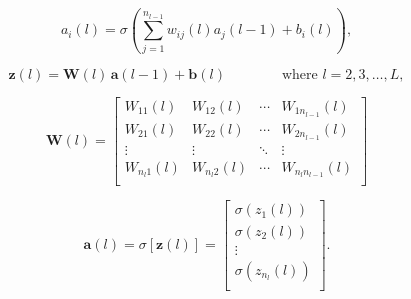 \documentclass[border=10pt,varwidth]{standalone}
\begin{document}
\begin{equation}
    a_i(l) = \sigma\left( \sum_{j=1}^{n_{l-1}} w_{ij}(l)a_j(l-1) +b_i(l) \right),
  \end{equation}

\begin{equation}
    \mathbf{z}(l) = \mathbf{W}(l) \, \mathbf{a}(l-1) + \mathbf{b}(l) \quad\quad\quad\quad \text{where } l= 2,3,\ldots,L,
\end{equation}

\begin{equation}
    \mathbf{W}(l)=\left[
    \begin{array}{cccc}
       W_{11}(l) &  W_{12}(l) &\cdots &  W_{1n_{l-1}}(l) \\
       W_{21}(l) &  W_{22}(l) &\cdots &  W_{2n_{l-1}}(l) \\
       \vdots &  \vdots & \ddots & \vdots \\
       W_{n_l1}(l) &  W_{n_l2}(l) &\cdots &  W_{n_ln_{l-1}}(l) \\
    \end{array}
    \right]
  \end{equation}

  \begin{equation}
    \mathbf{a}(l) = \sigma [\mathbf{z}(l)] =
     \left[  \begin{array}{c}
       \sigma \left( z_1(l) \right)  \\
       \sigma \left( z_2(l) \right)  \\
       \vdots  \\
       \sigma \left( z_{n_l}(l) \right)  \\
    \end{array} \right].
  \end{equation}
\end{document}
